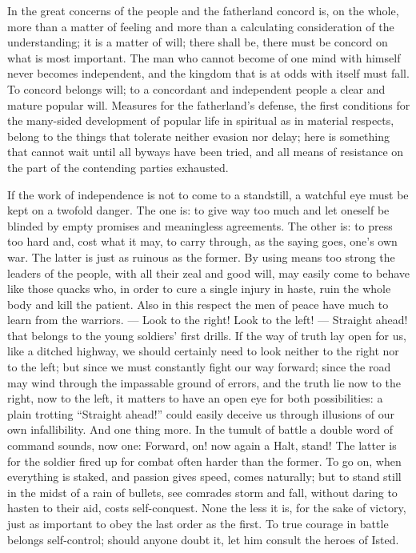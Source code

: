 \documentclass[12pt,a4paper,openany]{book}
\newcommand{\opage}[1]{\marginnote{\footnotesize\textit{[#1]}}}
\begin{document}
In the great concerns of the people and the fatherland
concord is, on the whole, more than a matter of feeling and more
than a calculating consideration of the understanding; it is a matter of will;
there shall be, there must be concord on what is most important.
The man who cannot become of one mind with himself
never becomes independent, and the kingdom that is
at odds with itself must fall. To concord belongs
will; to a concordant and independent people a clear and
mature popular will. Measures for the fatherland's
defense, the first conditions for the many-sided development
of popular life in spiritual as in material respects, belong to
the things that tolerate neither evasion nor delay; here
is something that cannot wait until all byways have been
tried, and all means of resistance on the part of the contending
parties exhausted.

If the work of independence is not to come to a standstill, a
watchful eye must be kept on a twofold danger. The one
is: to give way too much and let oneself be blinded by empty
promises and meaningless agreements. The other is:
to press too hard and, cost what it may,
to carry through, as the saying goes, one's own war. The latter is
just as ruinous as the former. By using
means too strong the leaders of the people, with all their
zeal and good will, may easily come to behave like
those quacks who, in order to cure a single
injury in haste, ruin the whole body and kill the patient.
Also in this respect the men of peace have much
to learn from the warriors. --- Look to the right! Look to the
left! --- Straight ahead! that belongs to the young soldiers'
first drills. If the way of truth lay open for
\setcounter{footnote}{0}%
\opage{161}us, like a ditched highway, we should certainly need
to look neither to the right nor to the left; but since we
must constantly fight our way forward; since the road may wind
through the impassable ground of errors, and the truth lie
now to the right, now to the left, it matters
to have an open eye for both possibilities: a plain trotting
``Straight ahead!'' could easily deceive us through illusions
of our own infallibility. And one thing more. In
the tumult of battle a double word of command sounds, now
one: Forward, on! now again a Halt, stand! The
latter is for the soldier fired up for combat often
harder than the former. To go on, when everything is staked,
and passion gives speed, comes naturally; but
to stand still in the midst of a rain of bullets, see comrades storm
and fall, without daring to hasten to their aid, costs
self-conquest. None the less it is, for the sake of victory,
just as important to obey the last order as
the first. To true courage in battle belongs self-control;
should anyone doubt it, let him consult
the heroes of Isted.
\end{document}
